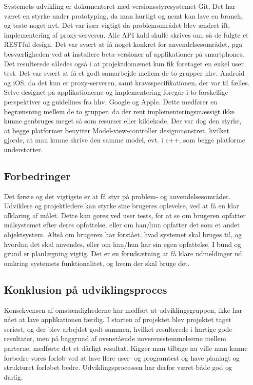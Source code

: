 \documentclass[12pt]{article}
\begin{document}
Systemets udvikling er dokumenteret med versionsstyresystemet Git. Det har været en styrke under prototyping, da man hurtigt og nemt kan lave en branch, og teste noget nyt. Det var især vigtigt da problemområdet blev ændret ift. implementering af proxy-serveren. Alle API kald skulle skrives om, så de fulgte et RESTful design. Det var svært at få noget konkret for anvendelsesområdet, pga besværligheden ved at installere beta-versioner af applikationer på smartphones. Det resulterede således også i at projektdomænet kun fik foretaget en enkel user test. Det var svært at få et godt samarbejde mellem de to grupper hhv. Android og iOS, da det kun er proxy-serveren, samt kravsspecifikationen, der var til fælles. Selve designet på applikationerne og implementering foregår i to forskellige perspektiver og guidelines fra hhv. Google og Apple. Dette medfører en begrænsning mellem de to grupper, da der rent implementeringsmæssigt ikke kunne genbruges meget så som resurser eller kildekode. Der var dog den styrke, at begge platformer benytter Model-view-controller designmønstret, hvilket gjorde, at man kunne skrive den samme model, evt. i c++, som begge platforme understøtter.

\subsection {Forbedringer}
Det første og det vigtigste er at få styr på problem- og anvendelsesområdet. Udviklere og projektledere kan styrke sine brugeres oplevelse, ved at få en klar afklaring af målet. Dette kan gøres ved user tests, for at se om brugeren opfatter målsystemet efter deres opfattelse, eller om han/hun opfatter det som et andet objektsystem. Altså om brugeren har forstået, hvad systemet skal bruges til, og hvordan det skal anvendes, eller om han/hun har sin egen opfattelse. I bund og grund er planlægning vigtig. Det er en forudsætning at få klare udmeldinger ud omkring systemets funktionalitet, og hvem der skal bruge det.  

\subsection* { Konklusion på udviklingsproces } 
Konsekvensen af omstændighederne har medført at udviklingsgruppen, ikke har nået at lave applikationen færdig. I starten af projektet blev projektet taget seriøst, og der blev arbejdet godt sammen, hvilket resulterede i hurtige gode resultater, men på baggrund af ovenstående uoverensstemmelserne mellem parterne, medførte det et dårligt resultat. Kigger man tilbage nu ville man kunne forbedre vores forløb ved at lave flere user- og programtest og have planlagt og strukturet forløbet bedre. Udviklingsprocessen har derfor været både god og dårlig.  
\end{document}
